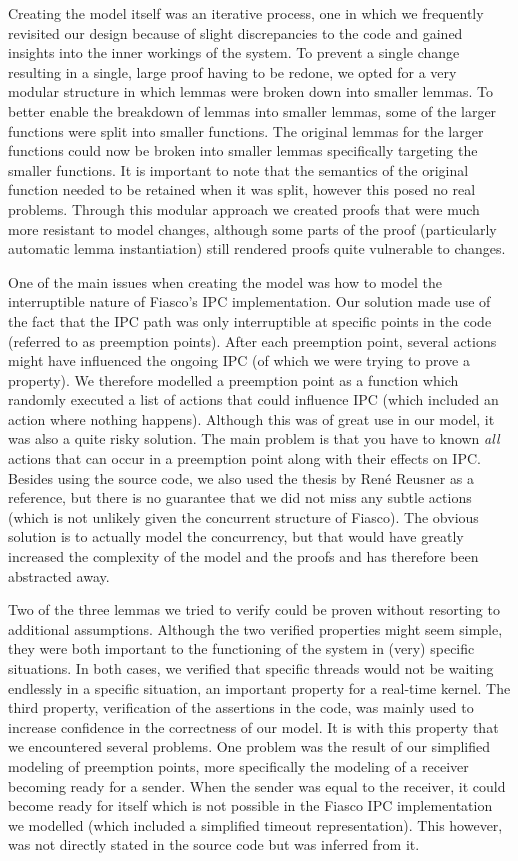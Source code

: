 Creating the model itself was an iterative process, one in which we frequently revisited our design because of slight discrepancies to the code and gained insights into the inner workings of the system. To prevent a single change resulting in a single, large proof having to be redone, we opted for a very modular structure in which lemmas were broken down into smaller lemmas. To better enable the breakdown of lemmas into smaller lemmas, some of the larger functions were split into smaller functions. The original lemmas for the larger functions could now be broken into smaller lemmas specifically targeting the smaller functions. It is important to note that the semantics of the original function needed to be retained when it was split, however this posed no real problems. Through this modular approach we created proofs that were much more resistant to model changes, although some parts of the proof (particularly automatic lemma instantiation) still rendered proofs quite vulnerable to changes.\emptyline

One of the main issues when creating the model was how to model the interruptible nature of Fiasco's IPC implementation. Our solution made use of the fact that the IPC path was only interruptible at specific points in the code (referred to as preemption points). After each preemption point, several actions might have influenced the ongoing IPC (of which we were trying to prove a property). We therefore modelled a preemption point as a function which randomly executed a list of actions that could influence IPC (which included an action where nothing happens). Although this was of great use in our model, it was also a quite risky solution. The main problem is that you have to known \textit{all} actions that can occur in a preemption point along with their effects on IPC. Besides using the source code, we also used the thesis by Ren\'e Reusner \cite{reusner05impl} as a reference, but there is no guarantee that we did not miss any subtle actions (which is not unlikely given the concurrent structure of Fiasco). The obvious solution is to actually model the concurrency, but that would have greatly increased the complexity of the model and the proofs and has therefore been abstracted away.\emptyline

Two of the three lemmas we tried to verify could be proven without resorting to additional assumptions. Although the two verified properties might seem simple, they were both important to the functioning of the system in (very) specific situations. In both cases, we verified that specific threads would not be waiting endlessly in a specific situation, an important property for a real-time kernel. The third property, verification of the assertions in the code, was mainly used to increase confidence in the correctness of our model. It is with this property that we encountered several problems. One problem was the result of our simplified modeling of preemption points, more specifically the modeling of a receiver becoming ready for a sender. When the sender was equal to the receiver, it could become ready for itself which is not possible in the Fiasco IPC implementation we modelled (which included a simplified timeout representation). This however, was not directly stated in the source code but was inferred from it.\emptyline

